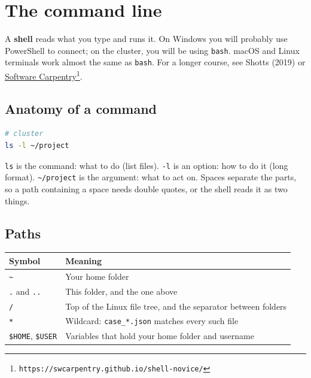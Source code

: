 \chapter{The command line}
\label{ch:shell}

A \textbf{shell} reads what you type and runs it. On Windows you will probably use PowerShell to connect; on the cluster, you will be using \texttt{bash}. macOS and Linux terminals work almost the same as \texttt{bash}. For a longer course, see Shotts (2019) or \href{https://swcarpentry.github.io/shell-novice/}{Software Carpentry}\footnote{\texttt{https://swcarpentry.github.io/shell-novice/}}.

\section{Anatomy of a command}\label{anatomy-of-a-command}

\begin{lstlisting}[language=bash]
# cluster
ls -l ~/project
\end{lstlisting}

\texttt{ls} is the command: what to do (list files). \texttt{-l} is an option: how to do it (long format). \texttt{\textasciitilde{}/project} is the argument: what to act on. Spaces separate the parts, so a path containing a space needs double quotes, or the shell reads it as two things.

\section{Paths}\label{paths}

{\def\LTcaptype{none} %
\begin{longtable}[]{@{}ll@{}}
\toprule\noalign{}
Symbol & Meaning \\
\midrule\noalign{}
\endhead
\bottomrule\noalign{}
\endlastfoot
\texttt{\textasciitilde{}} & Your home folder \\
\texttt{.} and \texttt{..} & This folder, and the one above \\
\texttt{/} & Top of the Linux file tree, and the separator between folders \\
\texttt{*} & Wildcard: \texttt{case\_*.json} matches every such file \\
\texttt{\$HOME}, \texttt{\$USER} & Variables that hold your home folder and username \\
\end{longtable}
}

